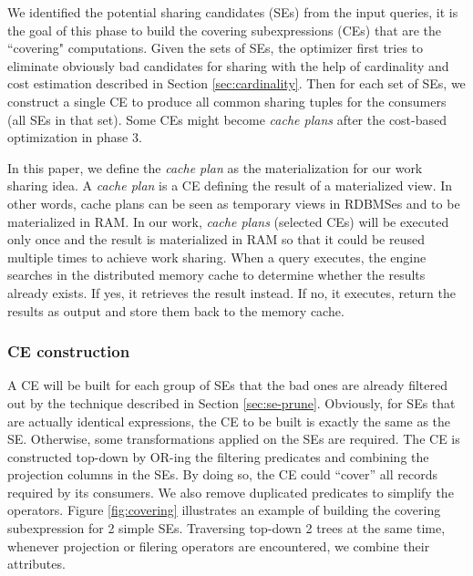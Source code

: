We identified the potential sharing candidates (SEs) from the input queries, it is the goal of this phase to build the covering subexpressions (CEs) that are the ``covering" computations. Given the sets of SEs, the optimizer first tries to eliminate obviously bad candidates for sharing with the help of cardinality and cost estimation described in Section \ref{sec:cardinality}. Then for each set of SEs, we construct a single CE to produce all common sharing tuples for the consumers (all SEs in that set). Some CEs might become \emph{cache plans} after the cost-based optimization in phase 3. 

In this paper, we define the \emph{cache plan} as the materialization for our work sharing idea. A \emph{cache plan} is a CE defining the result of a materialized view. In other words, cache plans can be seen as temporary views in RDBMSes and to be materialized in RAM. In our work, \emph{cache plans} (selected CEs) will be executed only once and the result is materialized in RAM so that it could be reused multiple times to achieve work sharing. When a query executes, the engine searches in the distributed memory cache to determine whether the results already exists. If yes, it retrieves the result instead. If no, it executes, return the results as output and store them back to the memory cache.

\subsubsection{CE construction}
\label{sec:ce-construction}
A CE will be built for each group of SEs that the bad ones are already filtered out by the technique described in Section \ref{sec:se-prune}. Obviously, for SEs that are actually identical expressions, the CE to be built is exactly the same as the SE. Otherwise, some transformations applied on the SEs are required. The CE is constructed top-down by OR-ing the filtering predicates and combining the projection columns in the SEs. By doing so, the CE could ``cover'' all records required by its consumers. We also remove duplicated predicates to simplify the operators. Figure \ref{fig:covering} illustrates an example of building the covering subexpression for 2 simple SEs. Traversing top-down 2 trees at the same time, whenever projection or filering operators are encountered, we combine their attributes.

